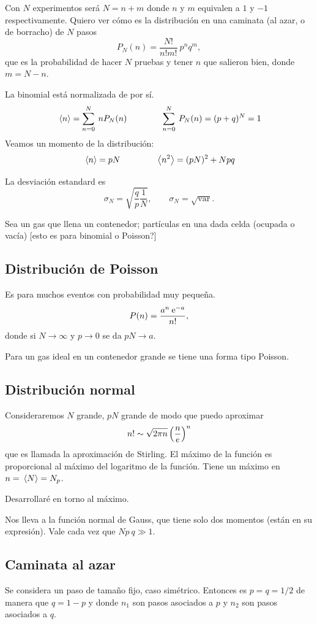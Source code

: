 \documentclass[10pt,oneside]{CBFT_book}
\begin{document}
Con $N$ experimentos será $N=n+m$ donde $n$ y $m$ equivalen a $1$ y $-1$ respectivamente.
Quiero ver cómo es la distribución en una caminata (al azar, o de borracho) de
$N$ pasos
\[
	P_N(n) = \frac{N!}{n! m!} \: p^n q^m,
\]
que es la probabilidad de hacer $N$ pruebas y tener $n$ que salieron bien, donde $m = N-n$.

La binomial está normalizada de por sí.
\[
	\:\left\langle n \right\rangle = \sum_{n=0}^N \: n P_N(n) \qquad \qquad 
	\sum_{n=0}^N \: P_N(n) = ( p + q )^N = 1
\]
Veamos un momento de la distribución:
\[
	\:\left\langle n \right\rangle = p N \qquad \qquad  \:\left\langle n^2 \right\rangle = (p N)^2 + N p q
\]

La desviación estandard es
\[
	\sigma_N = \sqrt{\frac{q}{p} \frac{1}{N}}, \qquad \sigma_N = \sqrt{\text{var}}.
\]

Sea un gas que llena un contenedor; partículas en una dada celda (ocupada o vacía) [esto es
para binomial o Poisson?]

\subsection{Distribución de Poisson}

Es para muchos eventos con probabilidad muy pequeña.
\[
	P(n) = \frac{a^n \:\mathrm{e}^{-a}}{n!},
\]
donde si $N\to\infty$ y $p\to 0$ se da $pN \to a$.

Para un gas ideal en un contenedor grande se tiene una forma tipo Poisson.

\subsection{Distribución normal}

Consideraremos $N$ grande, $pN$ grande de modo que puedo aproximar 
\[
	n! \sim \sqrt{2\pi n} \left( \frac{ n }{ e } \right)^n
\]
que es llamada la aproximación de Stirling.
El máximo de la función es proporcional al máximo del logaritmo de la función.
Tiene un máximo en $n = \:\left\langle N \right\rangle = N_p$.

Desarrollaré en torno al máximo.

Nos lleva a la función normal de Gauss, que tiene solo dos momentos (están en su
expresión). Vale cada vez que $N p \: q \gg 1$.

\subsection{Caminata al azar}

Se considera un paso de tamaño fijo, caso simétrico. Entonces es $p=q=1/2$ de manera que $q=1-p$
y donde $n_1$ son pasos asociados a $p$ y $n_2$ son pasos asociados a $q$.
\end{document}
